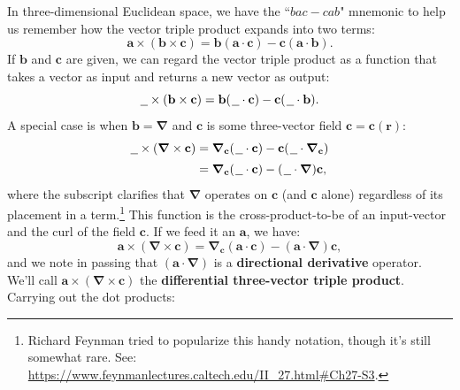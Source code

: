 \documentclass[12pt]{article}
\renewcommand{\vv}[1]{\mathbf{#1}}
\newcommand{\del}{\boldsymbol{\nabla}}
\begin{document}
In three-dimensional Euclidean space, we have the ``$bac - cab$" mnemonic to help us remember how the vector triple product expands into two terms:
\begin{equation*}
\vv a \times (\vv b \times \vv c) = \vv b (\vv a \cdot \vv c) - \vv c (\vv a \cdot \vv b).
\end{equation*}
If $\vv b$ and $\vv c$ are given, we can regard the vector triple product as a function that takes a vector as input and returns a new vector as output:
\begin{equation*}
\text{\underline{\hspace{.6em}}} \times (\vv b \times \vv c) = \vv b ( \mkern1.5mu \text{\underline{\hspace{.6em}}} \cdot \vv c ) - \vv c ( \mkern1.5mu \text{\underline{\hspace{.6em}}} \cdot \vv b ).
\end{equation*}
A special case is when $\vv b = \del$ and $\vv c$ is some three-vector field $\vv c = \vv c (\vv r)$:
\begin{equation}\label{eq:cc}
\begin{split}
\text{\underline{\hspace{.6em}}} \times (\del \times \vv c) &= \del_{\vv c} ( \mkern1.5mu \text{\underline{\hspace{.6em}}} \cdot \vv c ) - \vv c ( \mkern1.5mu \text{\underline{\hspace{.6em}}} \cdot \del_{\vv c} ) \\[2pt]
&= \del_{\vv c} ( \mkern1.5mu \text{\underline{\hspace{.6em}}} \cdot \vv c ) - ( \mkern1.5mu \text{\underline{\hspace{.6em}}} \cdot \del ) \vv c ,
\end{split}
\end{equation}
where the subscript clarifies that $\del$ operates on $\vv c$ (and $\vv c$ alone) regardless of its placement in a term.\footnote{\label{fn:fsn}Richard Feynman tried to popularize this handy notation, though it's still somewhat rare. See: \url{https://www.feynmanlectures.caltech.edu/II_27.html\#Ch27-S3}.} This function is the cross-product-to-be of an input-vector and the curl of the field $\vv c$. If we feed it an $\vv a$, we have:
\begin{equation*}
\vv a \times (\del \times \vv c) = \del_{\vv c} ( \vv a \cdot \vv c ) - ( \vv a \cdot \del ) \vv c ,
\end{equation*}
and we note in passing that $(\vv a \cdot \del)$ is a \textbf{directional derivative} operator. We'll call $\vv a \times (\del \times \vv c)$ the \textbf{differential three-vector triple product}. Carrying out the dot products:
\end{document}
